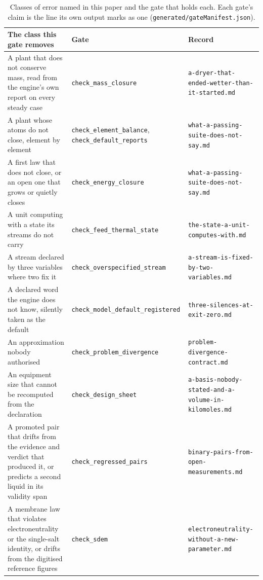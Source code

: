 \documentclass[11pt,a4paper]{article}
\newcommand{\brk}[1]{\nolinkurl{#1}}
\begin{document}
\begin{table}[h]
\centering\scriptsize
\caption{Classes of error named in this paper and the gate that holds each.
Each gate's claim is the line its own output marks as one
(\texttt{generated/gateManifest.json}).}
\label{tab:gates}
\renewcommand{\arraystretch}{1.08}
\begin{tabularx}{\linewidth}{>{\raggedright\arraybackslash}X
                             >{\raggedright\arraybackslash}p{3.7cm}
                             >{\raggedright\arraybackslash}p{4.8cm}}
\toprule
\textbf{The class this gate removes} & \textbf{Gate} & \textbf{Record} \\
\midrule
A plant that does not conserve mass, read from the engine's own report on
every steady case & \brk{check_mass_closure} &
\brk{a-dryer-that-ended-wetter-than-it-started.md} \\
A plant whose atoms do not close, element by element &
\brk{check_element_balance}, \brk{check_default_reports} &
\brk{what-a-passing-suite-does-not-say.md} \\
A first law that does not close, or an open one that grows or quietly closes &
\brk{check_energy_closure} &
\brk{what-a-passing-suite-does-not-say.md} \\
A unit computing with a state its streams do not carry &
\brk{check_feed_thermal_state} & \brk{the-state-a-unit-computes-with.md} \\
A stream declared by three variables where two fix it &
\brk{check_overspecified_stream} &
\brk{a-stream-is-fixed-by-two-variables.md} \\
A declared word the engine does not know, silently taken as the default &
\brk{check_model_default_registered} & \brk{three-silences-at-exit-zero.md} \\
An approximation nobody authorised & \brk{check_problem_divergence} &
\brk{problem-divergence-contract.md} \\
An equipment size that cannot be recomputed from the declaration &
\brk{check_design_sheet} &
\brk{a-basis-nobody-stated-and-a-volume-in-kilomoles.md} \\
A promoted pair that drifts from the evidence and verdict that produced
it, or predicts a second liquid in its validity span &
\brk{check_regressed_pairs} &
\brk{binary-pairs-from-open-measurements.md} \\
A membrane law that violates electroneutrality or the single-salt identity,
or drifts from the digitised reference figures & \brk{check_sdem} &
\brk{electroneutrality-without-a-new-parameter.md} \\

\end{tabularx}
\end{table}
\end{document}
